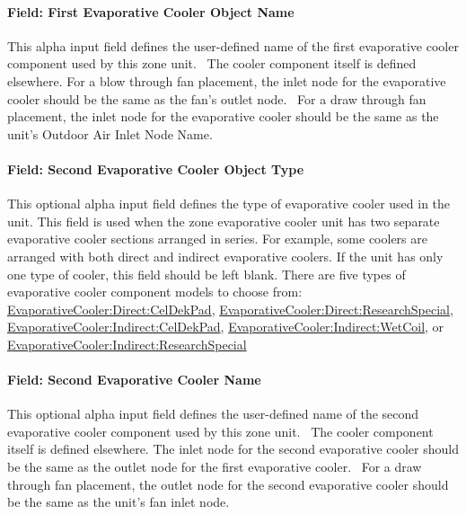 \paragraph{Field: First Evaporative Cooler Object Name}\label{field-first-evaporative-cooler-object-name}

This alpha input field defines the user-defined name of the first evaporative cooler component used by this zone unit.~ The cooler component itself is defined elsewhere. For a blow through fan placement, the inlet node for the evaporative cooler should be the same as the fan's outlet node.~ For a draw through fan placement, the inlet node for the evaporative cooler should be the same as the unit's Outdoor Air Inlet Node Name.

\paragraph{Field: Second Evaporative Cooler Object Type}\label{field-second-evaporative-cooler-object-type}

This optional alpha input field defines the type of evaporative cooler used in the unit. This field is used when the zone evaporative cooler unit has two separate evaporative cooler sections arranged in series. For example, some coolers are arranged with both direct and indirect evaporative coolers. If the unit has only one type of cooler, this field should be left blank. There are five types of evaporative cooler component models to choose from: \hyperref[evaporativecoolerdirectceldekpad]{EvaporativeCooler:Direct:CelDekPad}, \hyperref[evaporativecoolerdirectresearchspecial]{EvaporativeCooler:Direct:ResearchSpecial}, \hyperref[evaporativecoolerindirectceldekpad]{EvaporativeCooler:Indirect:CelDekPad}, \hyperref[evaporativecoolerindirectwetcoil]{EvaporativeCooler:Indirect:WetCoil}, or \hyperref[evaporativecoolerindirectresearchspecial]{EvaporativeCooler:Indirect:ResearchSpecial}

\paragraph{Field: Second Evaporative Cooler Name}\label{field-second-evaporative-cooler-name}

This optional alpha input field defines the user-defined name of the second evaporative cooler component used by this zone unit.~ The cooler component itself is defined elsewhere. The inlet node for the second evaporative cooler should be the same as the outlet node for the first evaporative cooler.~ For a draw through fan placement, the outlet node for the second evaporative cooler should be the same as the unit's fan inlet node.

